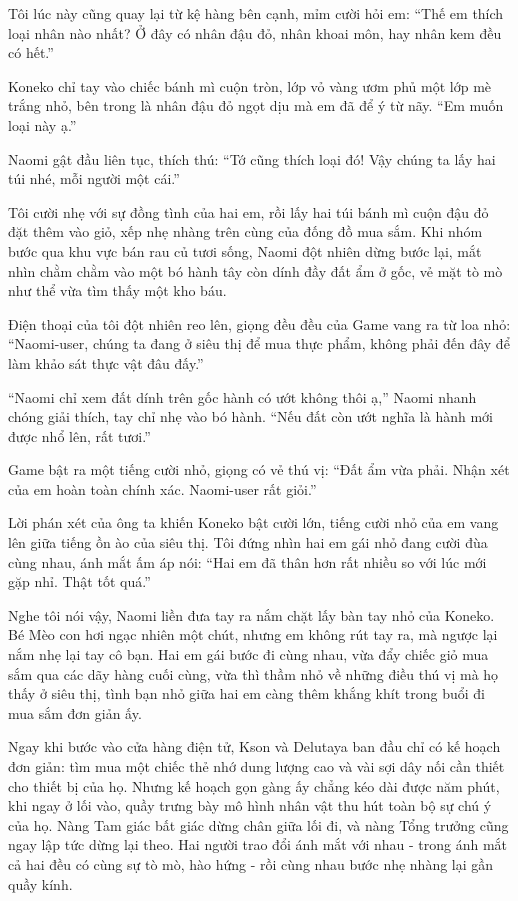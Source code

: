 ﻿\documentclass[../main.tex]{subfiles}
\begin{document}
Tôi lúc này cũng quay lại từ kệ hàng bên cạnh, mỉm cười hỏi em: ``Thế em thích loại nhân nào nhất? Ở đây có nhân đậu đỏ, nhân khoai môn, hay nhân kem đều có hết.''

Koneko chỉ tay vào chiếc bánh mì cuộn tròn, lớp vỏ vàng ươm phủ một lớp mè trắng nhỏ, bên trong là nhân đậu đỏ ngọt dịu mà em đã để ý từ nãy. ``Em muốn loại này ạ.''

Naomi gật đầu liên tục, thích thú: ``Tớ cũng thích loại đó! Vậy chúng ta lấy hai túi nhé, mỗi người một cái.''

Tôi cười nhẹ với sự đồng tình của hai em, rồi lấy hai túi bánh mì cuộn đậu đỏ đặt thêm vào giỏ, xếp nhẹ nhàng trên cùng của đống đồ mua sắm. Khi nhóm bước qua khu vực bán rau củ tươi sống, Naomi đột nhiên dừng bước lại, mắt nhìn chằm chằm vào một bó hành tây còn dính đầy đất ẩm ở gốc, vẻ mặt tò mò như thể vừa tìm thấy một kho báu.

Điện thoại của tôi đột nhiên reo lên, giọng đều đều của Game vang ra từ loa nhỏ: ``Naomi-user, chúng ta đang ở siêu thị để mua thực phẩm, không phải đến đây để làm khảo sát thực vật đâu đấy.''

``Naomi chỉ xem đất dính trên gốc hành có ướt không thôi ạ,'' Naomi nhanh chóng giải thích, tay chỉ nhẹ vào bó hành. ``Nếu đất còn ướt nghĩa là hành mới được nhổ lên, rất tươi.''

Game bật ra một tiếng cười nhỏ, giọng có vẻ thú vị: ``Đất ẩm vừa phải. Nhận xét của em hoàn toàn chính xác. Naomi-user rất giỏi.''

Lời phán xét của ông ta khiến Koneko bật cười lớn, tiếng cười nhỏ của em vang lên giữa tiếng ồn ào của siêu thị. Tôi đứng nhìn hai em gái nhỏ đang cười đùa cùng nhau, ánh mắt ấm áp nói: ``Hai em đã thân hơn rất nhiều so với lúc mới gặp nhỉ. Thật tốt quá.''

Nghe tôi nói vậy, Naomi liền đưa tay ra nắm chặt lấy bàn tay nhỏ của Koneko. Bé Mèo con hơi ngạc nhiên một chút, nhưng em không rút tay ra, mà ngược lại nắm nhẹ lại tay cô bạn. Hai em gái bước đi cùng nhau, vừa đẩy chiếc giỏ mua sắm qua các dãy hàng cuối cùng, vừa thì thầm nhỏ về những điều thú vị mà họ thấy ở siêu thị, tình bạn nhỏ giữa hai em càng thêm khắng khít trong buổi đi mua sắm đơn giản ấy.

\ct

\pov{-}

Ngay khi bước vào cửa hàng điện tử, Kson và Delutaya ban đầu chỉ có kế hoạch đơn giản: tìm mua một chiếc thẻ nhớ dung lượng cao và vài sợi dây nối cần thiết cho thiết bị của họ. Nhưng kế hoạch gọn gàng ấy chẳng kéo dài được năm phút, khi ngay ở lối vào, quầy trưng bày mô hình nhân vật thu hút toàn bộ sự chú ý của họ. Nàng Tam giác bất giác dừng chân giữa lối đi, và nàng Tổng trưởng cũng ngay lập tức dừng lại theo. Hai người trao đổi ánh mắt với nhau - trong ánh mắt cả hai đều có cùng sự tò mò, hào hứng - rồi cùng nhau bước nhẹ nhàng lại gần quầy kính.
\end{document}
